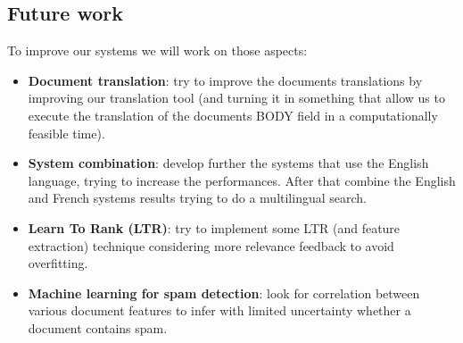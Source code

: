 \subsection{Future work}
\label{subsec:future}
To improve our systems we will work on those aspects:
\begin{itemize}
    \item \textbf{Document translation}: try to improve the documents translations by improving our translation tool (and turning it in something that allow us to execute the translation of the documents BODY field in a computationally feasible time).
    \item \textbf{System combination}: develop further the systems that use the English language, trying to increase the performances. After that combine the English and French systems results trying to do a multilingual search.
    \item \textbf{Learn To Rank (LTR)}: try to implement some LTR (and feature extraction) technique considering more relevance feedback to avoid overfitting.
    \item \textbf{Machine learning for spam detection}: look for correlation between various document features to infer with limited uncertainty whether a document contains spam.
\end{itemize}


